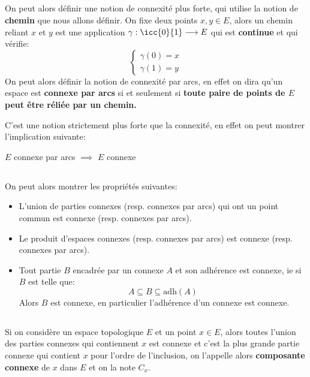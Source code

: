 \subsection*{}
On peut alors définir une notion de connexité plus forte, qui utilise la notion de \textbf{chemin} que nous allons définir. On fixe deux points \(x, y \in E\), alors un chemin reliant \(x\) et \(y\) est une application \(\gamma: \icc{0}{1} \longrightarrow E\) qui est \textbf{continue} et qui vérifie:
\[
   \begin{cases}
      \gamma(0) = x \\
      \gamma(1) = y
   \end{cases}
\]
On peut alors définir la notion de connexité par arcs, en effet on dira qu'un espace est \textbf{connexe par arcs} si et seulement si \textbf{toute paire de points de \(E\) peut être réliée par un chemin.}\<

C'est une notion strictement plus forte que la connexité, en effet on peut montrer l'implication suivante:
\begin{center}
   \(E\) connexe par arcs \(\implies\) \(E\) connexe
\end{center}

\subsection*{}
On peut alors montrer les propriétés suivantes:
\begin{itemize}
   \item L'union de parties connexes (resp. connexes par arcs) qui ont un point commun est connexe (resp. connexes par arcs).
   \item Le produit d'espaces connexes (resp. connexes par arcs) est connexe (resp. connexes par arcs).
   \item Tout partie \( B \) encadrée par un connexe \( A \) et son adhérence est connexe, ie si \( B \) est telle que:
   \[ 
      A \subseteq B \subseteq \text{adh}(A) 
   \]
   Alors \( B \) est connexe, en particulier l'adhérence d'un connexe est connexe.
\end{itemize}
\subsection*{}
Si on considère un espace topologique \(E\) et un point \(x \in E\), alors toutes l'union des parties connexes qui contiennent \(x\) est connexe et c'est la plus grande partie connexe qui contient \(x\) pour l'ordre de l'inclusion, on l'appelle alors \textbf{composante connexe} de \(x\) dans \(E\) et on la note \(C_x\).\<

